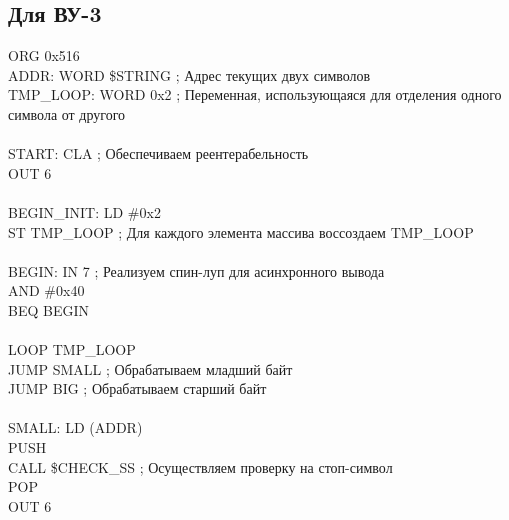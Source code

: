 \subsection{Для ВУ-3}
\noindent\hspace*{2.5cm} ORG 0x516\\
ADDR: 	\hspace*{13mm}WORD \$STRING ; Адрес текущих двух символов\\
TMP\_LOOP:	\hspace*{3mm}WORD 0x2 ; Переменная, использующаяся для отделения одного символа от другого\\
\\
START: 	\hspace*{12mm}CLA ; Обеспечиваем реентерабельность\\
\hspace*{2.5cm} OUT 6\\
\\
BEGIN\_INIT:\hspace*{2mm}	LD \#0x2\\
\hspace*{2.5cm} ST TMP\_LOOP ; Для каждого элемента массива воссоздаем TMP\_LOOP\\
\\
BEGIN:\hspace*{13mm}	IN 7 ; Реализуем спин-луп для асинхронного вывода\\
\hspace*{2.5cm} AND \#0x40\\
\hspace*{2.5cm} BEQ BEGIN\\
\\
\hspace*{2.5cm} LOOP TMP\_LOOP\\
\hspace*{2.5cm} JUMP SMALL ; Обрабатываем младший байт\\
\hspace*{2.5cm} JUMP BIG ; Обрабатываем старший байт\\
\\
SMALL:	\hspace*{12mm}LD (ADDR)\\
\hspace*{2.5cm} PUSH\\
\hspace*{2.5cm} CALL \$CHECK\_SS ; Осуществляем проверку на стоп-символ\\
\hspace*{2.5cm} POP\\
\hspace*{2.5cm} OUT 6\\

